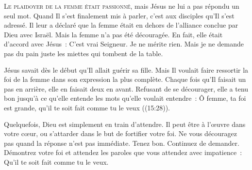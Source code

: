 \dvrule






\lettrine{L}{e plaidoyer de la femme était passionné,}
 mais Jésus ne lui a pas répondu un seul mot.
 Quand Il s'est finalement mis à parler, c'est aux disciples
 qu'Il s'est adressé. Il leur a déclaré que la femme était en dehors
 de l'alliance conclue par Dieu avec Israël.
 Mais la femme n'a pas été découragée.
 En fait, elle était d'accord avec Jésus~:
 \og C'est vrai Seigneur. Je ne mérite rien.
 Mais je ne demande pas du pain
 \ocadr juste les miettes qui tombent de la table. \fg{}


Jésus savait dès le début qu'Il allait guérir sa fille.
 Mais Il voulait faire ressortir la foi de la femme dans son expression
 la plus complète. Chaque fois qu'Il faisait un pas en arrière,
 elle en faisait deux en avant. Refusant de se décourager,
 elle a tenu bon jusqu'à ce qu'elle entende les mots
 qu'elle voulait entendre~: 
 \og Ô femme, ta foi est grande, qu'il te soit fait comme tu le veux \fg{}
 ((15:28)). 

Quelquefois, Dieu est simplement en train d'attendre.
 Il peut être à l'œuvre dans votre cœur, ou s'attarder dans le but
 de fortifier votre foi. Ne vous découragez pas quand la réponse
 n'est pas immédiate. Tenez bon. Continuez de  demander.
 Démontrez votre foi et attendez les paroles que vous attendez
 avec impatience~: 
 \og Qu'il te soit fait comme tu le veux. \fg{}

\dvrule



